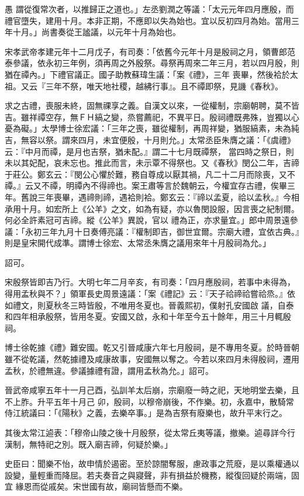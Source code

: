 \begin{pinyinscope}
 愚
 謂從復常次者，以推歸正之道也。」左丞劉潤之等議：「太元元年四月應殷，而禮官墮失，建用十月。本非正期，不應即以失為始也。宜以反初四月為始。當用三年十月。」尚書奏從王謐議，以元年十月為始也。



 宋孝武帝孝建元年十二月戊子，有司奏：「依舊今元年十月是殷祠之月，領曹郎范泰參議，依永初三年例，須再周之外殷祭。尋祭再周來二年三月，若以四月殷，則猶在禫內。」下禮官議正。國子助教蘇瑋生議：「案《禮》，三年
 喪畢，然後袷於太祖。又云『三年不祭，唯天地社稷，越紼行事』。且不禫即祭，見譏《春秋》。



 求之古禮，喪服未終，固無祼享之義。自漢文以來，一從權制，宗廟朝聘，莫不皆吉。雖祥禫空存，無ＦＨ縞之變，烝嘗薦祀，不異平日。殷祠禮既弗殊，豈獨以心憂為礙。」太學博士徐宏議：「三年之喪，雖從權制，再周祥變，猶服縞素，未為純吉，無容以祭。謂來四月，未宜便殷，十月則允。」太常丞臣朱膺之議：「《虞禮》云：『中月而禫，是月也吉祭，猶未配。』謂二十七月既禫祭，
 當四時之祭日，則未以其妃配，哀未忘也。推此而言，未示覃不得祭也。又《春秋》閔公二年，吉禘于莊公。鄭玄云：『閔公心懼於難，務自尊成以厭其禍，凡二十二月而除喪，又不禫。』云又不禫，明禫內不得禘也。案王肅等言於魏朝云，今權宜存古禮，俟畢三年。舊說三年喪畢，遇禘則禘，遇袷則袷。鄭玄云：『禘以孟夏，祫以孟秋。』今相承用十月。如宏所上《公羊》之文，如為有疑，亦以魯閔設服，因言喪之紀制爾。何必全許素冠可吉禘。縱《公羊》異說，官以
 禮為正，亦求量宜。」郎中周景遠參議：「永初三年九月十日奏傅亮議：『權制即吉，御世宜爾。宗廟大禮，宜依古典。』則是皇宋開代成準。謂博士徐宏、太常丞朱膺之議用來年十月殷祠為允。」



 詔可。



 宋殷祭皆即吉乃行。大明七年二月辛亥，有司奏：「四月應殷祠，若事中未得為，得用孟秋與不？」領軍長史周景遠議：「案《禮記》云：『天子祫禘祫嘗祫烝。』依如禮文，則夏秋冬三時皆殷，不唯用冬夏也。晉義熙初，僕射孔安國啟
 議，自泰和四年相承殷祭，皆用冬夏。安國又啟，永和十年至今五十餘年，用三十月輒殷祠。



 博士徐乾據《禮》難安國。乾又引晉咸康六年七月殷祠，是不專用冬夏。於時晉朝雖不從乾議，然乾據禮及咸康故事，安國無以奪之。今若以來四月未得殷祠，遷用孟秋，於禮無違。參議據禮有證，謂用孟秋為允。」詔可。



 晉武帝咸寧五年十一月己酉，弘訓羊太后崩，宗廟廢一時之祀，天地明堂去樂，且不上胙。升平五年十月己
 卯，殷祠，以穆帝崩後，不作樂。初，永嘉中，散騎常侍江統議曰：「《陽秋》之義，去樂卒事。」是為吉祭有廢樂也，故升平末行之。



 其後太常江逌表：「穆帝山陵之後十月殷祭，從太常丘夷等議，撤樂。逌尋詳今行漢制，無特祀之別。既入廟吉禘，何疑於樂。」



 史臣曰：聞樂不怡，故申情於遏密。至於諒闇奪服，慮政事之荒廢，是以乘權通以設變，量輕重而降屈。若夫奏音之與寢聲，非有損益於機務，縱復回疑於兩端，固宜
 緣恩而從戚矣。宋世國有故，廟祠皆懸而不樂。



\end{pinyinscope}